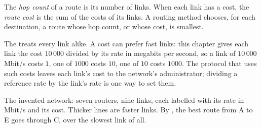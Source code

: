 \begin{definition}\label{def:g12:routing:metric}
The \emph{hop count} of a route is its number of links. When each link has a cost, the \emph{route
cost} is the sum of the costs of its links. A routing method chooses, for each destination, a route
whose hop count, or whose cost, is smallest.
\end{definition}

The  treats every link alike. A cost can prefer fast links: this chapter gives each link the cost
$10\,000$ divided by its rate in megabits per second, so a link of $10\,000$ Mbit/s costs $1$, one of $1000$ costs
$10$, one of $10$ costs $1000$. The protocol that uses such costs leaves each link's cost to the network's
administrator; dividing a reference rate by the link's rate is one way to set them.

\label{lst:g12:routing:network}

\begin{omfigure}

{\small The invented network: seven routers, nine links, each labelled with its rate in Mbit/s and its cost. Thicker
lines are faster links. By , the best route from A to E goes through C, over the slowest link of all.}
\end{omfigure}

\label{lst:g12:routing:costs}

